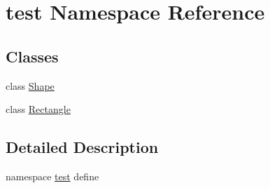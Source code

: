\hypertarget{namespacetest}{
\section{test Namespace Reference}
\label{namespacetest}
}


\subsection*{Classes}
\begin{CompactItemize}
\item 
class \hyperlink{classtest_1_1Shape}{Shape}
\item 
class \hyperlink{classtest_1_1Rectangle}{Rectangle}
\end{CompactItemize}


\subsection{Detailed Description}
namespace \hyperlink{namespacetest}{test} define 